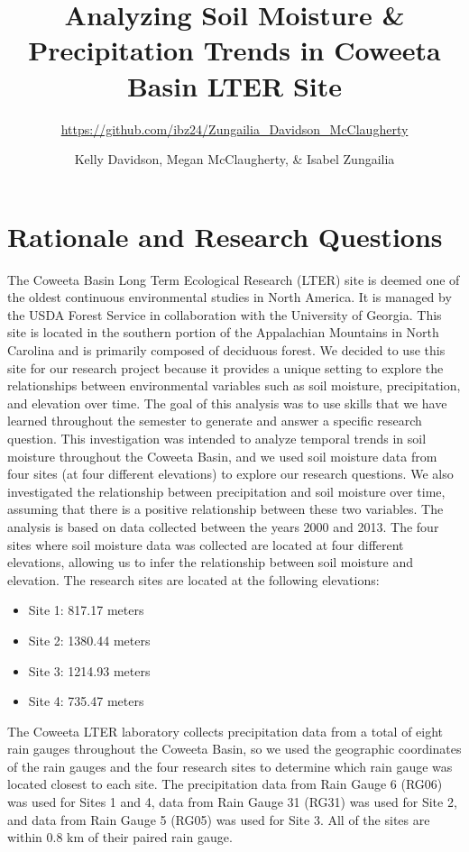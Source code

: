 \documentclass[
  12pt,
]{article}
\title{Analyzing Soil Moisture \& Precipitation Trends in Coweeta Basin
LTER Site}
\subtitle{\url{https://github.com/ibz24/Zungailia_Davidson_McClaugherty}}
\author{Kelly Davidson, Megan McClaugherty, \& Isabel Zungailia}
\date{}
\providecommand{\tightlist}{%
  \setlength{\itemsep}{0pt}\setlength{\parskip}{0pt}}
\begin{document}
\maketitle

\newpage
\tableofcontents 
\newpage
\listoftables 
\newpage
\listoffigures 
\newpage

\hypertarget{rationale-and-research-questions}{%
\section{Rationale and Research
Questions}\label{rationale-and-research-questions}}

The Coweeta Basin Long Term Ecological Research (LTER) site is deemed
one of the oldest continuous environmental studies in North America. It
is managed by the USDA Forest Service in collaboration with the
University of Georgia. This site is located in the southern portion of
the Appalachian Mountains in North Carolina and is primarily composed of
deciduous forest. We decided to use this site for our research project
because it provides a unique setting to explore the relationships
between environmental variables such as soil moisture, precipitation,
and elevation over time. The goal of this analysis was to use skills
that we have learned throughout the semester to generate and answer a
specific research question. This investigation was intended to analyze
temporal trends in soil moisture throughout the Coweeta Basin, and we
used soil moisture data from four sites (at four different elevations)
to explore our research questions. We also investigated the relationship
between precipitation and soil moisture over time, assuming that there
is a positive relationship between these two variables. The analysis is
based on data collected between the years 2000 and 2013. The four sites
where soil moisture data was collected are located at four different
elevations, allowing us to infer the relationship between soil moisture
and elevation. The research sites are located at the following
elevations:

\begin{itemize}
\tightlist
\item
  Site 1: 817.17 meters
\item
  Site 2: 1380.44 meters
\item
  Site 3: 1214.93 meters
\item
  Site 4: 735.47 meters
\end{itemize}

The Coweeta LTER laboratory collects precipitation data from a total of
eight rain gauges throughout the Coweeta Basin, so we used the
geographic coordinates of the rain gauges and the four research sites to
determine which rain gauge was located closest to each site. The
precipitation data from Rain Gauge 6 (RG06) was used for Sites 1 and 4,
data from Rain Gauge 31 (RG31) was used for Site 2, and data from Rain
Gauge 5 (RG05) was used for Site 3. All of the sites are within 0.8 km
of their paired rain gauge.
\end{document}
